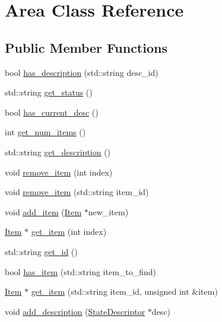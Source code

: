\hypertarget{class_area}{
\section{\-Area \-Class \-Reference}
\label{class_area}
}
\subsection*{\-Public \-Member \-Functions}
\begin{DoxyCompactItemize}
\item 
bool \hyperlink{class_area_a928ac4f85119316a126beafc575a5f84}{has\-\_\-description} (std\-::string desc\-\_\-id)
\item 
std\-::string \hyperlink{class_area_ac3f89059fe2ef23610dc3a5650c94c0d}{get\-\_\-status} ()
\item 
bool \hyperlink{class_area_a7a2701d4527e084ea7f8944925b539d7}{has\-\_\-current\-\_\-desc} ()
\item 
int \hyperlink{class_area_aee8135f25247d5e06dc0b28bf8cabcba}{get\-\_\-num\-\_\-items} ()
\item 
std\-::string \hyperlink{class_area_acab405d06547438ee02b3d8b9a2ff013}{get\-\_\-description} ()
\item 
void \hyperlink{class_area_a687234da51ac6da40d2aee426926dfcd}{remove\-\_\-item} (int index)
\item 
void \hyperlink{class_area_afee6d30b9d43a9960845e13f943584ad}{remove\-\_\-item} (std\-::string item\-\_\-id)
\item 
void \hyperlink{class_area_a8f4693277743a9dbc6ac0212fc02c86f}{add\-\_\-item} (\hyperlink{class_item}{\-Item} $\ast$new\-\_\-item)
\item 
\hyperlink{class_item}{\-Item} $\ast$ \hyperlink{class_area_aefbaaef99f691c1baf660f70a6ead3aa}{get\-\_\-item} (int index)
\item 
std\-::string \hyperlink{class_area_a19d6622fb6fb95f6ba5fb212e26728e6}{get\-\_\-id} ()
\item 
bool \hyperlink{class_area_adcc60d9dea5808c8bb0e21d672667b29}{has\-\_\-item} (std\-::string item\-\_\-to\-\_\-find)
\item 
\hyperlink{class_item}{\-Item} $\ast$ \hyperlink{class_area_a8c7af01c18c103932be5d22cddd30299}{get\-\_\-item} (std\-::string item\-\_\-id, unsigned int \&item)
\item 
void \hyperlink{class_area_a27101dd552a05cebb467f108a5246278}{add\-\_\-description} (\hyperlink{class_state_descriptor}{\-State\-Descriptor} $\ast$desc)

\end{DoxyCompactItemize}
